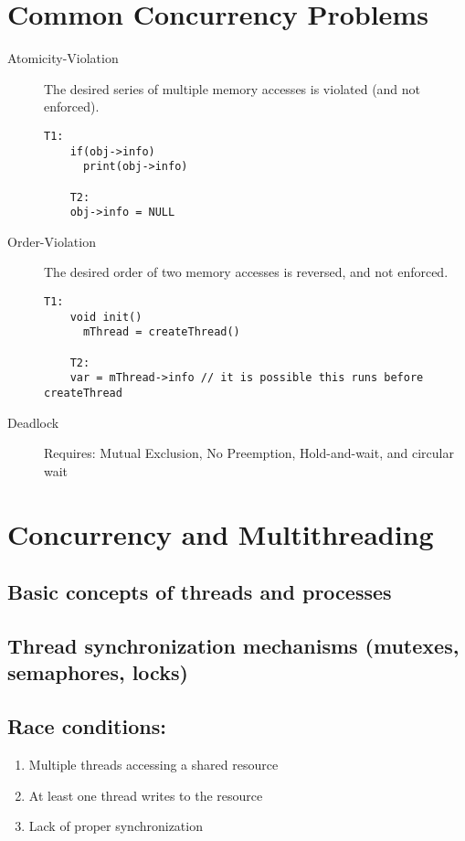 \documentclass{article}
\begin{document}
\section{Common Concurrency Problems}
\begin{description}
	\item[Atomicity-Violation] The desired series of multiple memory accesses is violated (and not enforced).
	      \begin{lstlisting}[style=cpp]
    T1:
    if(obj->info)
      print(obj->info)

    T2:
    obj->info = NULL
    \end{lstlisting}
\end{description}
\begin{description}
	\item[Order-Violation] The desired order of two memory accesses is reversed, and not enforced.
	      \begin{lstlisting}[style=cpp]
    T1:
    void init()
      mThread = createThread()

    T2:
    var = mThread->info // it is possible this runs before createThread
    \end{lstlisting}
\end{description}
\begin{description}
	\item[Deadlock]
	      Requires: Mutual Exclusion, No Preemption, Hold-and-wait, and circular wait
\end{description}
\section{Concurrency and Multithreading}
\subsection{ Basic concepts of threads and processes}
\subsection{ Thread synchronization mechanisms (mutexes, semaphores, locks)}
\subsection{ Race conditions:}
\begin{enumerate}
	\item Multiple threads accessing a shared resource
	\item At least one thread writes to the resource
	\item Lack of proper synchronization
\end{enumerate}
\end{document}
